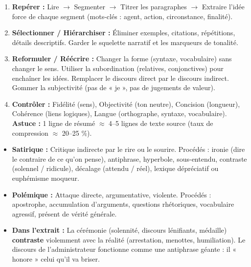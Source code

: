 \documentclass[11pt]{article}
\newcommand{\cle}[1]{{\popxbold\color{popdark}#1}}
\newcounter{popsec}
\newcounter{popsub}
\newcommand{\courssub}[1]{%
  \stepcounter{popsub}%
  \par\vspace{9pt}\noindent{\popxbold\fontsize{11.5}{13}\selectfont\color{popink}{\color{poporange}\thepopsec.\thepopsub}\hspace{6pt}#1}\par\nopagebreak\vspace{4pt}
}
\begin{document}
\courssub{Ressources à mobiliser}
\begin{definition}
\begin{enumerate}
    \item \textbf{Repérer :} Lire $\rightarrow$ Segmenter $\rightarrow$ Titrer les paragraphes $\rightarrow$ Extraire l'idée force de chaque segment (mots-clés : agent, action, circonstance, finalité).
    \item \textbf{Sélectionner / Hiérarchiser :} Éliminer exemples, citations, répétitions, détails descriptifs. Garder le \cle{squelette narratif} et les \cle{marqueurs de tonalité}.
    \item \textbf{Reformuler / Réécrire :} Changer la forme (syntaxe, vocabulaire) sans changer le sens. Utiliser la \cle{subordination} (relatives, conjonctives) pour enchaîner les idées. Remplacer le discours direct par le discours indirect. Gommer la subjectivité (pas de « je », pas de jugements de valeur).
    \item \textbf{Contrôler :} Fidélité (sens), Objectivité (ton neutre), Concision (longueur), Cohérence (liens logiques), Langue (orthographe, syntaxe, vocabulaire). \textbf{Astuce :} 1 ligne de résumé $\approx$ 4--5 lignes de texte source (taux de compression $\approx$ 20--25 \%).
\end{enumerate}
\end{definition}

\begin{definition}
\begin{itemize}
    \item \textbf{Satirique :} Critique indirecte par le rire ou le sourire. Procédés : \cle{ironie} (dire le contraire de ce qu'on pense), \cle{antiphrase}, \cle{hyperbole}, \cle{sous-entendu}, \cle{contraste} (solennel / ridicule), \cle{décalage} (attendu / réel), \cle{lexique dépréciatif} ou \cle{euphémisme} moqueur.
    \item \textbf{Polémique :} Attaque directe, argumentative, violente. Procédés : \cle{apostrophe}, \cle{accumulation} d'arguments, \cle{questions rhétoriques}, \cle{vocabulaire agressif}, \cle{présent de vérité générale}.
    \item \textbf{Dans l'extrait :} La cérémonie (solennité, discours lénifiants, médaille) \textbf{contraste} violemment avec la réalité (arrestation, menottes, humiliation). Le discours de l'administrateur fonctionne comme une \cle{antiphrase} géante : il « honore » celui qu'il va briser.
\end{itemize}
\end{definition}
\end{document}
